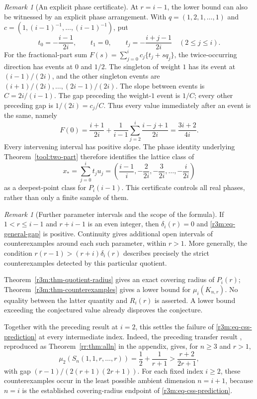 \documentclass[11pt,a4paper]{article}
\theoremstyle{remark}\newtheorem{remark}[theorem]{Remark}
\begin{document}
\begin{remark}[An explicit phase certificate]
\label{r3m:rem-phase-certificate}
At $r=i-1$, the lower bound can also be witnessed by an explicit
phase arrangement.  With
$q=(1,2,1,\ldots,1)$ and
$c=(1,(i-1)^{-1},\ldots,(i-1)^{-1})$, put
\[
 t_0=-\frac{i-1}{2i},\qquad t_1=0,\qquad
 t_j=-\frac{i+j-1}{2i}\quad(2\le j\le i).
\]
For the fractional-part sum
$F(s)=\sum_{j=0}^i c_j\{t_j+s q_j\}$, the twice-occurring direction
has events at $0$ and $1/2$.  The singleton of weight $1$ has its
event at $(i-1)/(2i)$, and the other singleton events are
$(i+1)/(2i),\ldots,(2i-1)/(2i)$.  The slope between events is
$C=2i/(i-1)$.  The gap preceding the weight-$1$ event is $1/C$;
every other preceding gap is $1/(2i)=c_j/C$.  Thus every value
immediately after an event is the same, namely
\[
 F(0)=\frac{i+1}{2i}
       +\frac1{i-1}\sum_{j=2}^i\frac{i-j+1}{2i}
     =\frac{3i+2}{4i}.
\]
Every intervening interval has positive slope.  The phase identity
underlying Theorem~\ref{tool:two-part} therefore identifies the lattice
class of
\[
 x_*=\sum_{j=0}^i t_j u_j
 =\left(\frac{i-1}{i},-\frac2{2i},-\frac3{2i},
                     \ldots,-\frac{i}{2i}\right)
\]
as a deepest-point class for $P_i(i-1)$.
This certificate controls all real phases, rather than only a finite
sample of them.
\end{remark}

\begin{remark}[Further parameter intervals and the scope of the formula]
\label{r3m:rem-scope}
If $1<r\le i-1$ and $r+i-1$ is an even integer, then
$\delta_i(r)=0$ and \eqref{r3m:eq-general-gap} is positive.
Continuity gives additional open intervals of counterexamples around
each such parameter, within $r>1$.
More generally, the condition
$r(r-1)>(r+i)\delta_i(r)$ describes precisely the strict
counterexamples detected by this particular quotient.

Theorem~\ref{r3m:thm-quotient-radius} gives an exact covering radius
of $P_i(r)$; Theorem~\ref{r3m:thm-counterexamples} gives a lower
bound for $\mu_i(K_{n,r})$.  No equality between the latter quantity
and $R_i(r)$ is asserted.  A lower bound exceeding the conjectured
value already disproves the conjecture.
\end{remark}

Together with the preceding result at $i=2$, this settles the failure
of \eqref{r3m:eq-css-prediction} at every intermediate index.
Indeed, the preceding transfer result
\cite[Theorem~4.2]{TransferTwo}, reproduced as
Theorem~\ref{rr:thm:alln} in the appendix, gives, for $n\ge3$ and $r>1$,
\[
 \mu_2(S_n(1,1,r,\ldots,r))
 =\frac12+\frac1{r+1}
 >\frac{r+2}{2r+1},
\]
with gap $(r-1)/(2(r+1)(2r+1))$.
For each fixed index $i\ge2$, these counterexamples occur in the
least possible ambient dimension $n=i+1$, because $n=i$ is the
established covering-radius endpoint of \eqref{r3m:eq-css-prediction}.
\end{document}
